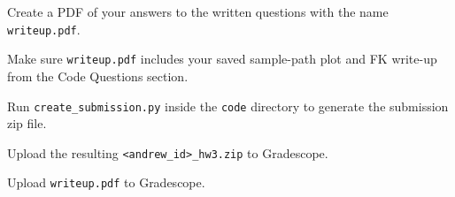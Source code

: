 \documentclass{16384_doc}
\begin{document}
\begin{submissionChecklist}
			\item Create a PDF of your answers to the written questions with the name \verb!writeup.pdf!.
		\item Make sure \verb!writeup.pdf! includes your saved sample-path plot and FK write-up from the Code Questions section.
		\item Run \verb!create_submission.py! inside the \verb!code! directory to generate the submission zip file.
		\item Upload the resulting \verb!<andrew_id>_hw3.zip! to Gradescope.
		\item Upload \verb!writeup.pdf! to Gradescope.
	\end{submissionChecklist}
\end{document}
